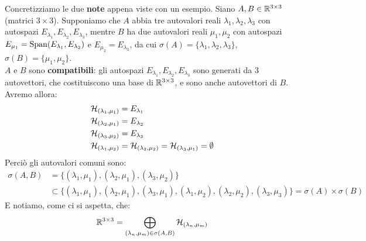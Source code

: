 \documentclass[../../FisicaTeorica.tex]{subfiles}
\begin{document}
\begin{expl}
Concretizziamo le due \textbf{note} appena viste con un esempio. Siano $A, B \in \mathbb{R}^{3\times 3}$ (matrici $3\times 3$). Supponiamo che $A$ abbia tre autovalori reali $\lambda_1, \lambda_2, \lambda_3$ con autospazi $E_{\lambda_1}, E_{\lambda_2}, E_{\lambda_3}$, mentre $B$ ha due autovalori reali $\mu_1, \mu_2$ con autospazi $E_{\mu_1}=\operatorname{Span}(E_{\lambda_1},E_{\lambda_2})$ e $E_{\mu_2}=E_{\lambda_3}$, da cui $\sigma(A)=\{\lambda_1,\lambda_2, \lambda_3\}$, $\sigma(B)=\{\mu_1, \mu_2\}$.\\
$A$ e $B$ sono \textbf{compatibili}: gli autospazi $E_{\lambda_1}, E_{\lambda_2}, E_{\lambda_3}$ sono generati da $3$ autovettori, che costituiscono una base di $\mathbb{R}^{3\times 3}$, e sono anche autovettori di $B$.\\
Avremo allora:
\begin{align*}
\hs_{(\lambda_1,\mu_1)}&=E_{\lambda_1}\\
\hs_{(\lambda_2,\mu_1)}&=E_{\lambda_2}\\
\hs_{(\lambda_3, \mu_2)} &= E_{\lambda_3}\\
\hs_{(\lambda_1, \mu_2)} =\hs_{(\lambda_2,\mu_2)}=\hs_{(\lambda_3,\mu_1)}=\emptyset \span
\end{align*}
Perciò gli autovalori comuni sono:
\begin{align*}
\sigma(A,B)&=\{(\lambda_1, \mu_1), (\lambda_2,\mu_1), (\lambda_3,\mu_2)\}\\
&\subset \{(\lambda_1,\mu_1),(\lambda_2,\mu_1), (\lambda_3,\mu_1), (\lambda_1,\mu_2),(\lambda_2,\mu_2),(\lambda_3,\mu_3) \} = \sigma(A)\times\sigma(B)
\end{align*}
E notiamo, come ci si aspetta, che:
\[
\mathbb{R}^{3\times 3} = \bigoplus_{(\lambda_n, \mu_m)\in \sigma(A,B)}\mathcal{H}_{(\lambda_n, \mu_m)}
\]
\end{expl}
\end{document}

